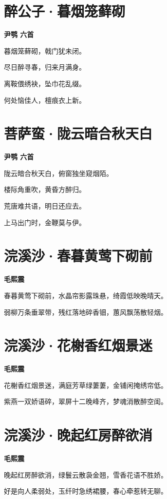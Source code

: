 \documentclass[12pt,a4paper]{ctexbook}
\begin{document}
\section{醉公子·暮烟笼藓砌}
\textbf{尹鹗 六首}\par\vspace{0.5em}
暮烟笼藓砌，戟门犹未闭。\par
尽日醉寻春，归来月满身。\par
离鞍偎绣袂，坠巾花乱缀。\par
何处恼佳人，檀痕衣上新。\par

\section{菩萨蛮·陇云暗合秋天白}
\textbf{尹鹗 六首}\par\vspace{0.5em}
陇云暗合秋天白，俯窗独坐窥烟陌。\par
楼际角重吹，黄昏方醉归。\par
荒唐难共语，明日还应去。\par
上马出门时，金鞭莫与伊。\par

\section{浣溪沙·春暮黄莺下砌前}
\textbf{毛熙震}\par\vspace{0.5em}
春暮黄莺下砌前，水晶帘影露珠悬，绮霞低映晚晴天。\par
弱柳万条垂翠带，残红落地碎香钿，蕙风飘荡散轻烟。\par

\section{浣溪沙·花榭香红烟景迷}
\textbf{毛熙震}\par\vspace{0.5em}
花榭香红烟景迷，满庭芳草绿萋萋，金铺闲掩绣帘低。\par
紫燕一双娇语碎，翠屏十二晚峰齐，梦魂消散醉空闺。\par

\section{浣溪沙·晚起红房醉欲消}
\textbf{毛熙震}\par\vspace{0.5em}
晚起红房醉欲消，绿鬟云散袅金翘，雪香花语不胜娇。\par
好是向人柔弱处，玉纤时急绣裙腰，春心牵惹转无聊。\par
\end{document}
